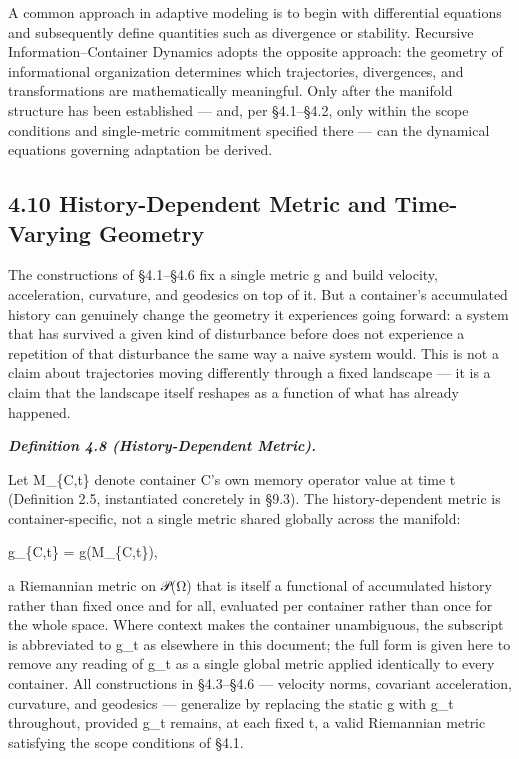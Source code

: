 \documentclass[
]{article}
\begin{document}
A common approach in adaptive modeling is to begin with differential
equations and subsequently define quantities such as divergence or
stability. Recursive Information--Container Dynamics adopts the opposite
approach: the geometry of informational organization determines which
trajectories, divergences, and transformations are mathematically
meaningful. Only after the manifold structure has been established ---
and, per §4.1--§4.2, only within the scope conditions and single-metric
commitment specified there --- can the dynamical equations governing
adaptation be derived.

\hypertarget{history-dependent-metric-and-time-varying-geometry}{%
\subsection{4.10 History-Dependent Metric and Time-Varying
Geometry}\label{history-dependent-metric-and-time-varying-geometry}}

The constructions of §4.1--§4.6 fix a single metric g and build
velocity, acceleration, curvature, and geodesics on top of it. But a
container's accumulated history can genuinely change the geometry it
experiences going forward: a system that has survived a given kind of
disturbance before does not experience a repetition of that disturbance
the same way a naive system would. This is not a claim about
trajectories moving differently through a fixed landscape --- it is a
claim that the landscape itself reshapes as a function of what has
already happened.

\emph{\textbf{Definition 4.8 (History-Dependent Metric).}}

Let M\_\{C,t\} denote container C's own memory operator value at time t
(Definition 2.5, instantiated concretely in §9.3). The history-dependent
metric is container-specific, not a single metric shared globally across
the manifold:

g\_\{C,t\} = g(M\_\{C,t\}),

a Riemannian metric on 𝒫(Ω) that is itself a functional of accumulated
history rather than fixed once and for all, evaluated per container
rather than once for the whole space. Where context makes the container
unambiguous, the subscript is abbreviated to g\_t as elsewhere in this
document; the full form is given here to remove any reading of g\_t as a
single global metric applied identically to every container. All
constructions in §4.3--§4.6 --- velocity norms, covariant acceleration,
curvature, and geodesics --- generalize by replacing the static g with
g\_t throughout, provided g\_t remains, at each fixed t, a valid
Riemannian metric satisfying the scope conditions of §4.1.
\end{document}
